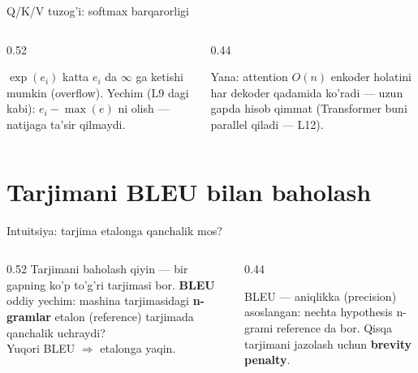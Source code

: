 \documentclass[aspectratio=169,11pt]{beamer}
\begin{document}
\begin{frame}{Q/K/V tuzog'i: softmax barqarorligi}
  \begin{columns}[T]
    \begin{column}{0.52\textwidth}
      \begin{tcolorbox}[warnbox,title=Katta energiyalar overflow]
        \small
        $\exp(e_i)$ katta $e_i$ da $\infty$ ga ketishi mumkin (overflow). Yechim
        (L9 dagi kabi): $e_i - \max(e)$ ni olish --- natijaga ta'sir qilmaydi.
      \end{tcolorbox}
    \end{column}
    \begin{column}{0.44\textwidth}
      \begin{tcolorbox}[okbox,top=2pt,bottom=2pt]
        \footnotesize
        Yana: attention $O(n)$ enkoder holatini har dekoder qadamida ko'radi ---
        uzun gapda hisob qimmat (Transformer buni parallel qiladi --- L12).
      \end{tcolorbox}
    \end{column}
  \end{columns}
\end{frame}

\section[BLEU]{Tarjimani BLEU bilan baholash}

\begin{frame}{Intuitsiya: tarjima etalonga qanchalik mos?}
  \begin{columns}[T]
    \begin{column}{0.52\textwidth}
      \small
      Tarjimani baholash qiyin --- bir gapning ko'p to'g'ri tarjimasi bor.
      \textbf{BLEU} oddiy yechim: mashina tarjimasidagi \textbf{n-gramlar} etalon
      (reference) tarjimada qanchalik uchraydi?\\[4pt]
      Yuqori BLEU $\Rightarrow$ etalonga yaqin.
    \end{column}
    \begin{column}{0.44\textwidth}
      \begin{tcolorbox}[okbox,top=2pt,bottom=2pt]
        \footnotesize
        BLEU --- aniqlikka (precision) asoslangan: nechta hypothesis n-grami
        reference da bor. Qisqa tarjimani jazolash uchun \textbf{brevity penalty}.
      \end{tcolorbox}
    \end{column}
  \end{columns}
\end{frame}
\end{document}
